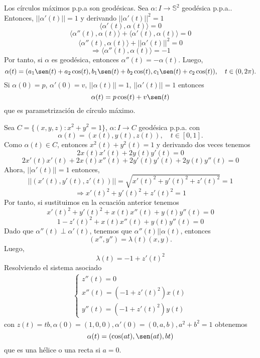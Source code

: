 \begin{ejm}[Esfera]
  Los círculos máximos p.p.a son geodésicas. Sea $\alpha : I \to \mathbb{S}^{2}$ geodésica p.p.a.. Entonces, $||\alpha'(t)|| = 1$ y derivando $||\alpha'(t)||^{2} = 1$
  \[ 
    \langle \alpha'(t){ , }\alpha(t) \rangle = 0
  \] 
  \[ 
    \langle \alpha''(t){ , }\alpha(t) \rangle + \langle \alpha'(t){ , }\alpha(t) \rangle = 0
  \] 
  \[ 
    \langle \alpha''(t){ , }\alpha(t) \rangle + ||\alpha'(t)||^{2} = 0
  \] 
  \[ 
    \Rightarrow \langle \alpha''(t){ , }\alpha(t) \rangle = -1
  \] 
  Por tanto, si $\alpha$ es geodésica, entonces $\alpha''(t) = - \alpha(t)$. Luego,
  \[ 
    \alpha(t) = (a_{1}\sen(t) + a_{2}\cos(t), b_{1}\sen(t) + b_{2}\cos(t), c_{1}\sen(t) + c_{2} \cos(t)), \quad t \in ( 0, 2 \pi ).
  \] 
  Si $\alpha(0) = p$, $\alpha'(0) = v$, $||\alpha(t)|| = 1$, $||\alpha'(t)|| = 1$ entonces
  \[ 
    \alpha(t) = p \cos(t) + v \sen(t) 
  \] 
  que es parametrización de círculo máximo.
\end{ejm}

\begin{ejm}[Cilindro]
  Sea $C = \{ (x,y,z) : x^{2} + y^{2} = 1 \}$, $\alpha : I \to C$ geodésica p.p.a. con 
  \[ 
    \alpha(t) = (x(t), y(t), z(t)), \quad t \in [0, 1].
  \] 
  Como $\alpha(t) \in C$, entonces $x^{2}(t) + y^{2}(t) = 1$ y derivando dos veces tenemos
  \[ 
    2x(t)x'(t) + 2y(t)y'(t) = 0 
  \] 
  \[ 
    2x'(t)x'(t) + 2x(t)x''(t) + 2y'(t)y'(t) + 2y(t)y''(t) = 0
  \] 
  Ahora, $||\alpha'(t)|| = 1$ entonces,
  \[ 
    ||(x'(t), y'(t), z'(t))|| = \sqrt{x'(t)^{2} + y'(t)^{2} + z'(t)^{2}} = 1
  \] 
  \[ 
    \Rightarrow x'(t)^{2} + y'(t)^{2} + z'(t)^{2} = 1
  \] 
  Por tanto, si sustituimos en la ecuación anterior tenemos
  \[ 
    x'(t)^{2} + y'(t)^{2} + x(t)x''(t) + y(t)y''(t) = 0 
  \] 
  \[ 
    1 - z'(t)^{2} + x(t)x''(t) + y(t)y''(t) = 0 
  \] 
  Dado que $\alpha''(t) \perp \alpha'(t)$, tenemos que $\alpha''(t) || \alpha(t)$, entonces
  \[ 
    (x'', y'') = \lambda(t) (x, y).
  \] 
  Luego,
  \[ 
    \lambda(t) = -1 + z'(t)^{2} 
  \] 
  Resolviendo el sistema asociado
  \[ 
    \begin{aligned}
      \begin{cases}
        z''(t) = 0 \\
        x''(t) = (-1 + z'(t)^{2}) x(t) \\
        y''(t) = (-1 + z'(t)^{2}) y(t)
      \end{cases}
    \end{aligned} 
  \] 
  con $z(t) = t b, \alpha(0) = (1,0,0), \alpha'(0) = (0, a, b), a^{2} + b^{2} = 1$ obtenemos
  \[ 
    \alpha(t) = (\cos(at), \sen(at), bt)
  \] 
  que es una hélice o una recta si $a = 0$.
\end{ejm}

